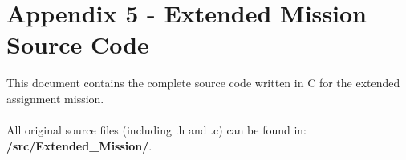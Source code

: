 \documentclass{article}
\begin{document}
\section*{Appendix 5 - Extended Mission Source Code}

This document contains the complete source code written in C for the extended assignment mission.\\\\
All original source files (including .h and .c) can be found in: \textbf{/src/Extended\_Mission/}.
\end{document}
